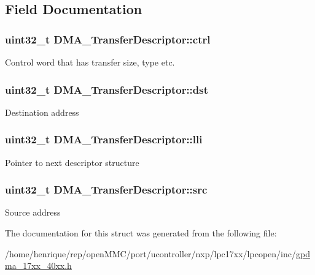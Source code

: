 \subsection{Field Documentation}
\hypertarget{structDMA__TransferDescriptor_a6b9f6124eb0961c8ccea5c455d135e60}{
\subsubsection[{ctrl}]{\setlength{\rightskip}{0pt plus 5cm}uint32\-\_\-t D\-M\-A\-\_\-\-Transfer\-Descriptor\-::ctrl}}\label{structDMA__TransferDescriptor_a6b9f6124eb0961c8ccea5c455d135e60}
Control word that has transfer size, type etc. \hypertarget{structDMA__TransferDescriptor_a661ff33fa31f405b89905f385299e271}{
\subsubsection[{dst}]{\setlength{\rightskip}{0pt plus 5cm}uint32\-\_\-t D\-M\-A\-\_\-\-Transfer\-Descriptor\-::dst}}\label{structDMA__TransferDescriptor_a661ff33fa31f405b89905f385299e271}
Destination address \hypertarget{structDMA__TransferDescriptor_ad53035ccb28664c56800a73bb20a7c79}{
\subsubsection[{lli}]{\setlength{\rightskip}{0pt plus 5cm}uint32\-\_\-t D\-M\-A\-\_\-\-Transfer\-Descriptor\-::lli}}\label{structDMA__TransferDescriptor_ad53035ccb28664c56800a73bb20a7c79}
Pointer to next descriptor structure \hypertarget{structDMA__TransferDescriptor_a03862efce0e0845dce0cd47e51ed038f}{
\subsubsection[{src}]{\setlength{\rightskip}{0pt plus 5cm}uint32\-\_\-t D\-M\-A\-\_\-\-Transfer\-Descriptor\-::src}}\label{structDMA__TransferDescriptor_a03862efce0e0845dce0cd47e51ed038f}
Source address 

The documentation for this struct was generated from the following file\-:\begin{DoxyCompactItemize}
\item 
/home/henrique/rep/open\-M\-M\-C/port/ucontroller/nxp/lpc17xx/lpcopen/inc/\hyperlink{gpdma__17xx__40xx_8h}{gpdma\-\_\-17xx\-\_\-40xx.\-h}\end{DoxyCompactItemize}
